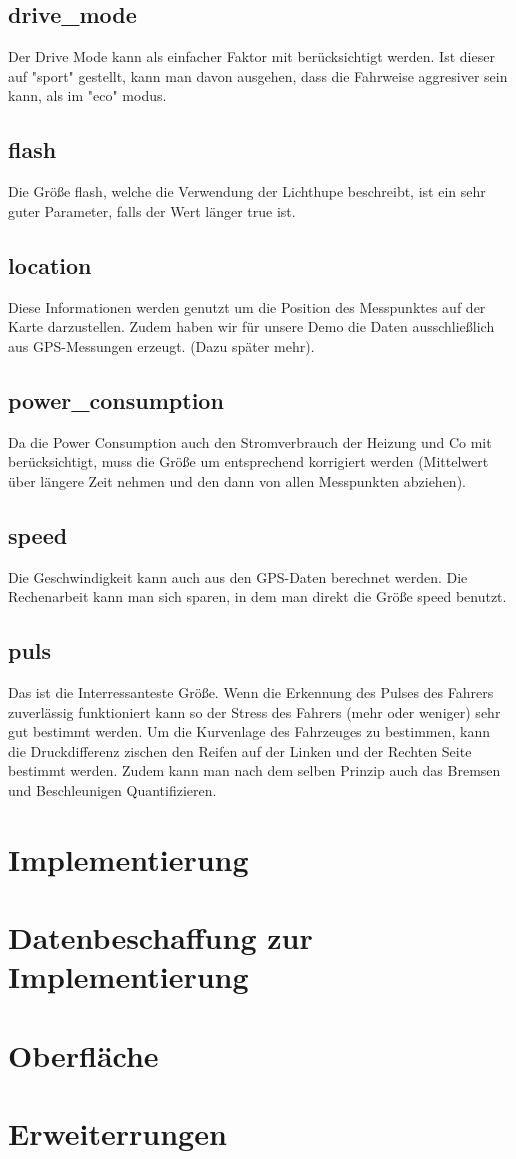 \documentclass[twocolumn,a4paper,10pt]{IEEEtran}
\begin{document}
	\subsection{drive_mode}
		Der Drive Mode kann als einfacher Faktor mit berücksichtigt werden. Ist dieser auf "sport" gestellt, kann man davon ausgehen, dass die Fahrweise aggresiver sein kann, als im "eco" modus.
	\subsection{flash}
		Die Größe flash, welche die Verwendung der Lichthupe beschreibt, ist ein sehr guter Parameter, falls der Wert länger true ist.
	\subsection{location}
		Diese Informationen werden genutzt um die Position des Messpunktes auf der Karte darzustellen. Zudem haben wir für unsere Demo die Daten ausschließlich aus GPS-Messungen erzeugt. (Dazu später mehr).
	\subsection{power_consumption}
		Da die Power Consumption auch den Stromverbrauch der Heizung und Co mit berücksichtigt, muss die Größe um entsprechend korrigiert werden (Mittelwert über längere Zeit nehmen und den dann von allen Messpunkten abziehen).
	\subsection{speed}
		Die Geschwindigkeit kann auch aus den GPS-Daten berechnet werden. Die Rechenarbeit kann man sich sparen, in dem man direkt die Größe speed benutzt.
	\subsection{puls}
		Das ist die Interressanteste Größe. Wenn die Erkennung des Pulses des Fahrers zuverlässig funktioniert kann so der Stress des Fahrers (mehr oder weniger) sehr gut bestimmt werden.
		Um die Kurvenlage des Fahrzeuges zu bestimmen, kann die Druckdifferenz zischen den Reifen auf der Linken und der Rechten Seite bestimmt werden. Zudem kann man nach dem selben Prinzip auch das Bremsen und Beschleunigen Quantifizieren. 
	\subsection{}

\section{Implementierung}
	
	
\section{Datenbeschaffung zur Implementierung}
\section{Oberfläche}
\section{Erweiterrungen}
	
\end{document}
